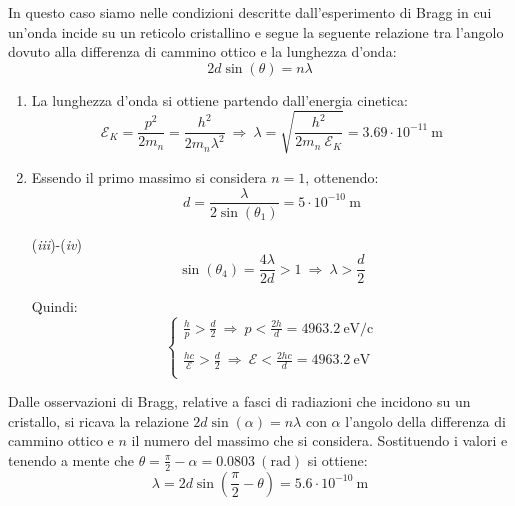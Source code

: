 \documentclass[12pt,twoside,a4]{article}
\begin{document}
\begin{solution}
	In questo caso siamo nelle condizioni descritte dall'esperimento di Bragg in cui un'onda incide su un reticolo cristallino e segue la seguente relazione tra l'angolo dovuto alla differenza di cammino ottico e la lunghezza d'onda: \begin{equation*}
2 d \sin{(\theta)} = n\lambda    
\end{equation*}      

\begin{enumerate}[label=(\textit{\roman*})]
\item  La lunghezza d'onda si ottiene partendo dall'energia cinetica: \begin{equation*}
 \mathcal{E}_K = \frac{p^2}{2 m_n} = \frac{h^2}{2 m_n \lambda^2}  \  \Rightarrow   \  \lambda = \sqrt{\frac{h^2}{2 m_n \ \mathcal{E}_K}} = 3.69 \cdot 10^{-11} \ \mathrm{m} 
\end{equation*}
    
\item  Essendo il primo massimo si considera $n = 1$, ottenendo: \begin{equation*}
 d = \frac{\lambda}{2 \sin{(\theta_1)}} = 5 \cdot 10^{-10} \ \mathrm{m}    
\end{equation*}    

\item[(\textit{iii})-(\textit{iv})] \begin{equation*}
 \sin{(\theta_4)} = \frac{4 \lambda}{2 d} > 1  \  \Rightarrow  \  \lambda > \frac{d}{2}   
\end{equation*}
       
       Quindi: 
       \begin{equation*}
   \begin{cases}
   \frac{h}{p} >  \frac{ d}{2}  \  \Rightarrow  \  p < \frac{2 h}{d} = 4963.2 \ \mathrm{eV/c} \\
   \\
   \frac{h c}{\mathcal{E}} >  \frac{d}{2}  \  \Rightarrow  \  \mathcal{E} < \frac{2 h c }{ d } = 4963.2 \ \mathrm{eV}  \\
   \end{cases} 
       \end{equation*}
       
\end{enumerate}
\end{solution}


\newpage
\begin{solution}
	Dalle osservazioni di Bragg, relative a fasci di radiazioni che incidono su un cristallo, si ricava la relazione $2d \sin{(\alpha)} = n\lambda$ con $\alpha$ l'angolo della differenza di cammino ottico e $n$ il numero del massimo che si considera. Sostituendo i valori e tenendo a mente che $\theta = \frac{\pi}{2} - \alpha = 0.0803 \ \mathrm{(rad)}$ si ottiene: 
 \begin{equation*}
     \lambda = 2d \sin{\left(\frac{\pi}{2} - \theta\right)} = 5.6 \cdot 10^{-10} \ \mathrm{m} 
 \end{equation*}
\end{solution}
\end{document}

